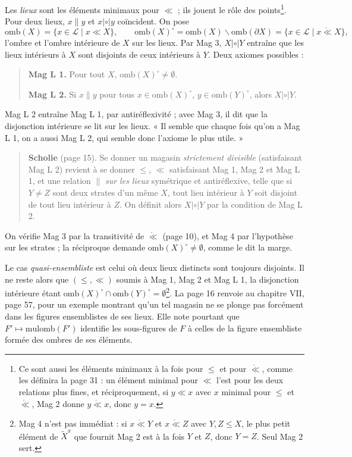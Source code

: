 \documentclass[11pt,a4paper]{article}
\begin{document}
Les \emph{lieux} sont les éléments minimaux pour $\ll$ ; ils jouent le rôle des
points\footnote{Ce sont aussi les éléments minimaux à la fois pour $\leq$ et
pour $\mathring{\ll}$, comme les définira la page 31 : un élément minimal pour
$\ll$ l'est pour les deux relations plus fines, et réciproquement, si $y \ll x$
avec $x$ minimal pour $\leq$ et $\mathring{\ll}$, Mag 2 donne $y
\mathrel{\mathring{\ll}} x$, donc $y = x$.}. Pour deux lieux, $x \parallel y$
et $x \mathrel{|\circ|} y$ coïncident. On pose
\[
\mathrm{omb}(X) = \{x \in \mathcal{L} \mid x \ll X\}, \qquad
\mathrm{omb}(X)^{\circ} = \mathrm{omb}(X) \smallsetminus \mathrm{omb}(\partial
X) = \{x \in \mathcal{L} \mid x \mathrel{\mathring{\ll}} X\},
\]
l'ombre et l'ombre intérieure de $X$ sur les lieux. Par Mag 3, $X
\mathrel{|\circ|} Y$ entraîne que les lieux intérieurs à $X$ sont disjoints de
ceux intérieurs à $Y$. Deux axiomes possibles :

\begin{quote}
\textbf{Mag L 1.} Pour tout $X$, $\mathrm{omb}(X)^{\circ} \neq \emptyset$.

\textbf{Mag L 2.} Si $x \parallel y$ pour tous $x \in \mathrm{omb}(X)^{\circ}$,
$y \in \mathrm{omb}(Y)^{\circ}$, alors $X \mathrel{|\circ|} Y$.
\end{quote}

Mag L 2 entraîne Mag L 1, par antiréflexivité ; avec Mag 3, il dit que la
disjonction intérieure se lit sur les lieux. « Il semble que chaque fois qu'on a
Mag L 1, on a aussi Mag L 2, qui semble donc l'axiome le plus utile. »

\begin{quote}
\textbf{Scholie} (page 15). Se donner un magasin \emph{strictement divisible}
(satisfaisant Mag L 2) revient à se donner $\leq$, $\ll$ satisfaisant Mag 1,
Mag 2 et Mag L 1, et une relation $\parallel$ \emph{sur les lieux} symétrique et
antiréflexive, telle que si $Y \neq Z$ sont deux strates d'un même $X$, tout
lieu intérieur à $Y$ soit disjoint de tout lieu intérieur à $Z$. On définit
alors $X \mathrel{|\circ|} Y$ par la condition de Mag L 2.
\end{quote}

On vérifie Mag 3 par la transitivité de $\mathring{\ll}$ (page 10), et Mag 4 par
l'hypothèse sur les strates ; la réciproque demande $\mathrm{omb}(X)^{\circ}
\neq \emptyset$, comme le dit la marge.

Le cas \emph{quasi-ensembliste} est celui où deux lieux distincts sont toujours
disjoints. Il ne reste alors que $(\leq, \ll)$ soumis à Mag 1, Mag 2 et Mag L
1, la disjonction intérieure étant $\mathrm{omb}(X)^{\circ} \cap
\mathrm{omb}(Y)^{\circ} = \emptyset$\footnote{Mag 4 n'est pas immédiat : si $x
\mathrel{\mathring{\ll}} Y$ et $x \mathrel{\mathring{\ll}} Z$ avec $Y, Z \leq
X$, le plus petit élément de $\widetilde{X}^{x}$ que fournit Mag 2 est à la
fois $Y$ et $Z$, donc $Y = Z$. Seul Mag 2 sert.}. La page 16 renvoie au
chapitre VII, page 57, pour un exemple montrant qu'un tel magasin ne se plonge
pas forcément dans les figures ensemblistes de ses lieux. Elle note pourtant
que $F' \mapsto \mathrm{mulomb}(F')$ identifie les sous-figures de $F$ à celles
de la figure ensembliste formée des ombres de ses éléments.
\end{document}
